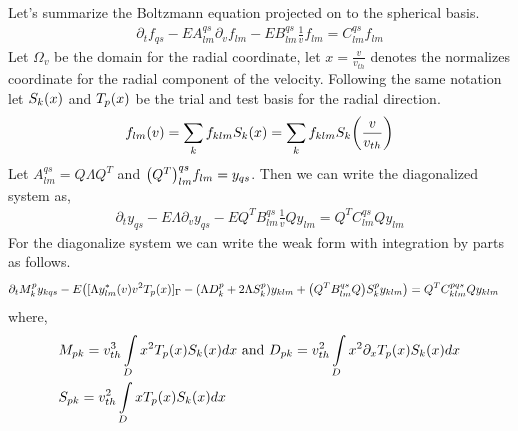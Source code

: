 \documentclass{article}[draft]
\begin{document}
Let's summarize the Boltzmann equation projected on to the spherical basis. 
\begin{align*}
	\partial_t f_{qs}  - E A^{qs}_{lm} \partial_{v} f_{lm} - E B^{qs}_{lm} \frac{1}{v} f_{lm} = C^{qs}_{lm} f_{lm}
\end{align*} Let $\Omega_v$ be the domain for the radial coordinate, let $x=\frac{v}{v_{th}}$ denotes the normalizes coordinate for the radial component of the velocity. Following the same notation let $S_{k}\of{x}$ and $T_{p}\of{x}$ be the trial and test basis for the radial direction.  
\begin{align*}
	f_{lm}\of{v} = \sum_{k} f_{klm} S_k \of{x} = \sum_{k} f_{klm} S_k \of{\frac{v}{v_{th}}}
\end{align*} Let $A^{qs}_{lm} = Q \Lambda Q^T$ and $\of{Q^T}^{qs}_{lm} f_{lm}= y_{qs}$. Then we can write the diagonalized system as, 
\begin{align*}
	\partial_t y_{qs} -E\Lambda \partial_v y_{qs}  -E Q^T B^{qs}_{lm} \frac{1}{v} Q y_{lm} = 
	Q^T C^{qs}_{lm} Q y_{lm}
\end{align*} For the diagonalize system we can write the weak form with integration by parts as follows. 
\begin{align*}
&\partial_t M^{p}_{k} y_{kqs} 
	-E\of{
		  [\Lambda y_{lm}^*(v) v^2 T_{p}\of{x}]_{\Gamma}		
		 -(\Lambda D^{p}_k + 2 \Lambda S^{p}_{k}) y_{klm} 
		 + \of{Q^T B^{qs}_{lm} Q} S^{p}_{k} y_{klm}
	 }   
 	 =
 	 Q^T C^{pqs}_{klm}Q y_{klm}
\end{align*} where, 
\begin{align*}
	&M_{pk} = v_{th}^3\myint_{D} x^2 T_{p}\of{x} S_{k}\of{x} dx \text{  and }
	D_{pk} = v_{th}^2\myint_{D} x^2 \partial_x T_{p}\of{x} S_{k}\of{x} dx \\
	&S_{pk} = v_{th}^2\myint_{D} x T_{p}\of{x} S_{k}\of{x} dx 
\end{align*} 
 
\newpage
\end{document}
